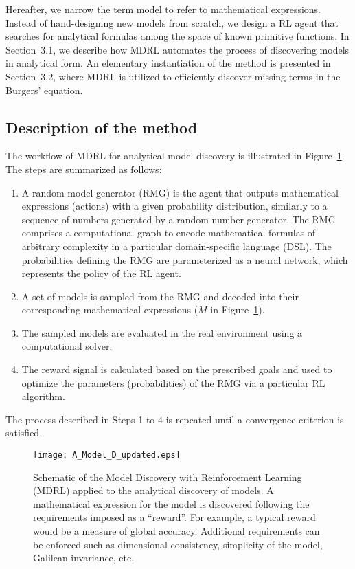 \documentclass{article}
\begin{document}
Hereafter, we narrow the term model to refer to mathematical
expressions.  Instead of hand-designing new models from scratch, we
design a RL agent that searches for analytical formulas among the
space of known primitive functions.  In Section~3.1, we describe how
MDRL automates the process of discovering models in analytical
form. An elementary instantiation of the method is presented in
Section~3.2, where MDRL is utilized to efficiently discover missing
terms in the Burgers' equation.



\subsection{Description of the method}


The workflow of MDRL for analytical model discovery is illustrated in
Figure~\ref{fig:AMD}.  The steps are summarized as follows:
\begin{enumerate}
    \item[(1)] A random model generator (RMG) is the agent that
      outputs mathematical expressions (actions) with a given
      probability distribution, similarly to a sequence of numbers
      generated by a random number generator. The RMG comprises a
      computational graph to encode mathematical formulas of arbitrary
      complexity in a particular domain-specific language (DSL).  The
      probabilities defining the RMG are parameterized as a neural
      network, which represents the policy of the RL agent.
      \item[(2)] A set of models is sampled from the RMG and decoded into
        their corresponding mathematical expressions ($M$ in
        Figure~\ref{fig:AMD}).
    \item[(3)] The sampled models are evaluated in the real
      environment using a computational solver.
    \item[(4)] The reward signal is calculated based on the prescribed goals
      and used to optimize the parameters (probabilities) of the RMG
      via a particular RL algorithm.
\end{enumerate}
The process described in Steps 1 to 4 is repeated until a convergence
criterion is satisfied.
\begin{figure}
    \centering
    \texttt{[image: A\_Model\_D\_updated.eps]}
    \caption{Schematic of the Model Discovery with Reinforcement
      Learning (MDRL) applied to the analytical discovery of models. A
      mathematical expression for the model is discovered following
      the requirements imposed as a ``reward''. For example, a typical
      reward would be a measure of global accuracy. Additional
      requirements can be enforced such as dimensional consistency,
      simplicity of the model, Galilean invariance,
      etc. \label{fig:AMD}}
\end{figure}
\end{document}
